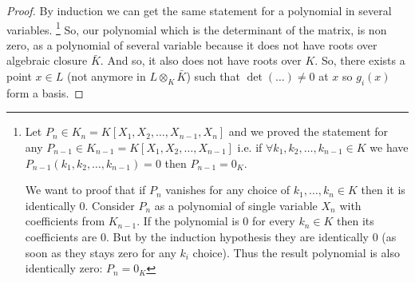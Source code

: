 \begin{theorem}
\begin{proof}
    By induction we can get the same statement for a polynomial in
    several variables.
    \footnote{
      Let $P_n \in K_n = K\left[X_1, X_2, \dots, X_{n-1}, X_n\right]$ and we
      proved the statement for any $P_{n-1} \in K_{n-1} = K\left[X_1, X_2, \dots,
        X_{n-1}\right]$ i.e. if $\forall k_1, k_2, \dots, k_{n-1}
      \in K$ we have $P_{n-1}\left(k_1, k_2, \dots, k_{n-1}\right) =
      0$ then $P_{n-1} = 0_K$.

      We want to proof that if $P_n$ vanishes for any choice of
      $k_1, \dots, k_n \in K$ then it is identically 0. 
      Consider $P_n$ as a polynomial of single
      variable $X_n$ with coefficients from $K_{n-1}$. If the
      polynomial is 0 for every $k_n \in K$ then its coefficients are
      0. But by the induction hypothesis they are identically 0 (as
      soon as they stays zero for any $k_i$ choice). Thus the result
      polynomial is also identically zero: $P_n = 0_K$
    }
    So, our polynomial which is the determinant of
    the matrix,  
    is non zero, as a polynomial of several variable because it 
    does not have roots over algebraic closure $\bar{K}$. 
    And so, it also does not have roots over $K$. So, there
    exists a point $x \in L$ (not anymore in $L \otimes_K \bar{K}$)
    such that $\det(\dots) \ne 0$ at $x$ so $g_i\left(x\right)$ form a
    basis.


\end{proof}
\end{theorem}
